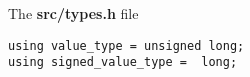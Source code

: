 
The \textbf{src/types.h} file

\begin{lstlisting}[style=CStyle]
using value_type = unsigned long;
using signed_value_type =  long;
\end{lstlisting}